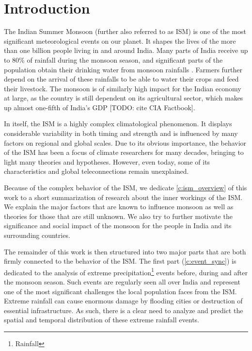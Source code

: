 \chapter{Introduction}
\label{c:introduction}

The Indian Summer Monsoon (further also referred to as ISM) is one of the most significant meteorological events on our planet. It shapes the lives of the more than one billion people living in and around India. Many parts of India receive up to 80\% of rainfall during the monsoon season, and significant parts of the population obtain their drinking water from monsoon rainfalls \citep{Stolbova.2015}. Farmers further depend on the arrival of these rainfalls to be able to water their crops and feed their livestock. The monsoon is of similarly high impact for the Indian economy at large, as the country is still dependent on its agricultural sector, which makes up almost one-fifth of India's GDP [TODO: cite CIA Factbook].

In itself, the ISM is a highly complex climatological phenomenon. It displays considerable variability in both timing and strength and is influenced by many factors on regional and global scales. Due to its obvious importance, the behavior of the ISM has been a focus of climate researchers for many decades, bringing to light many theories and hypotheses. However, even today, some of its characteristics and global teleconnections remain unexplained.

Because of the complex behavior of the ISM, we dedicate \cref{c:ism_overview} of this work to a short summarization of research about the inner workings of the ISM. We explain the major factors that are known to influence monsoon as well as theories for those that are still unknown. We also try to further motivate the significance and social impact of the monsoon for the people in India and its surrounding countries.

The remainder of this work is then structured into two major parts that are both firmly connected to the behavior of the ISM. The first part (\cref{c:event_sync}) is dedicated to the analysis of extreme precipitation\footnote{Rainfall} events before, during and after the monsoon season. Such events are regularly seen all over India and represent one of the most significant challenges the local population faces from the ISM. Extreme rainfall can cause enormous damage by flooding cities or destruction of essential infrastructure. As such, there is a clear need to analyze and predict the spatial and temporal distribution of these extreme rainfall events.

